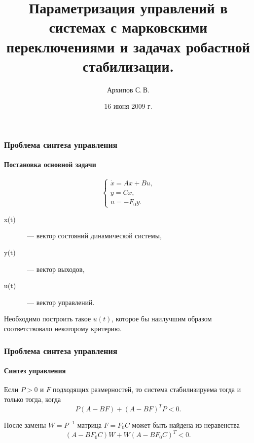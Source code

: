 \documentclass[ignorenonframetext,hyperref={pdftex,unicode},compress,handout]{beamer}
\title{Параметризация управлений в системах с марковскими переключениями и задачах робастной стабилизации.}
\author{Архипов С.\,В.}
\institute{Научный руководитель: Пакшин П.\,В.}
\date{16 июня 2009 г.}
\newcommand{\br}{\vspace{12pt}}
\begin{document}
\begin{frame}
\titlepage
\end{frame}



\begin{frame}
    \frametitle{Проблема синтеза управления}
    \framesubtitle{Постановка основной задачи}
    \begin{equation} %
        \left\{
            \begin{array}{l}
                \dot{x} = Ax + Bu\mbox{,} \\
                y = Cx\mbox{,} \\
                u = -F_0y\mbox{.}
            \end{array}
        \right.
    \end{equation}
    \br
    \begin{description}
        \item[x(t)]~--- вектор состояний динамической системы,
        \item[y(t)]~--- вектор выходов,
        \item[u(t)]~--- вектор управлений.
    \end{description}
    \br
    \par Необходимо построить такое $u(t)$, которое бы \alert{наилучшим образом} соответствовало некоторому критерию.
\end{frame}




\begin{frame}
    \frametitle{Проблема синтеза управления}
    \framesubtitle{Синтез управления}
    \par Если $P>0$ и $F$ подходящих размерностей, то система стабилизируема тогда и только тогда, когда
    \begin{equation} %
        P(A-BF)+(A-BF)^TP < 0\mbox{.}
    \end{equation}
    \br
    \par После замены $W=P^{-1}$ матрица $F=F_0C$ может быть найдена из неравенства
    \begin{equation}
        (A-BF_0C)W+W(A-BF_0C)^T < 0\mbox{.}
    \end{equation}
\end{frame}
\end{document}
